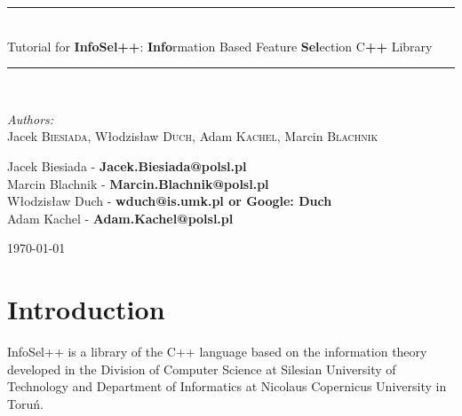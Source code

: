 \documentclass[a4paper,fleqn]{report}
\newcommand{\HRule}{\rule{\linewidth}{0.5mm}}
\begin{document}
\begin{titlepage}
 
\begin{center}
 
 
\HRule \\[0.4cm]
{\LARGE 
Tutorial for {\bf InfoSel++}: {\bf Info}rmation Based Feature {\bf Sel}ection C{\bf++} Library 
}
\HRule \\[1.5cm]
 
\begin{center} \large
\emph{Authors:}\\
Jacek \textsc{Biesiada},
W{\l}odzis{\l}aw \textsc{Duch},
Adam \textsc{Kachel},
Marcin \textsc{Blachnik}
\end{center}
 
\vfill
\begin{flushleft}
Jacek Biesiada - \textbf{Jacek.Biesiada@polsl.pl}\\
Marcin Blachnik - \textbf{Marcin.Blachnik@polsl.pl}\\
W{\l}odzis{\l}aw Duch - \textbf{wduch@is.umk.pl or Google: Duch}\\
Adam Kachel - \textbf{Adam.Kachel@polsl.pl}\\
\end{flushleft}
 
{\large \today}
\end{center}

\end{titlepage}

%
\tableofcontents


\chapter{Introduction}

InfoSel++ is a library of the C++ language 
based on the information theory developed  
in the Division of Computer Science at Silesian University of Technology and 
Department of Informatics at Nicolaus Copernicus University in Toru{\'n}.
\end{document}
